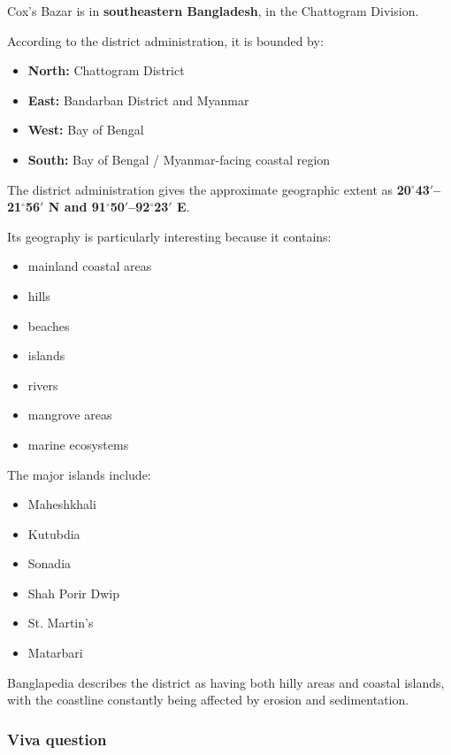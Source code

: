 Cox's Bazar is in \textbf{southeastern Bangladesh}, in the Chattogram Division.

According to the district administration, it is bounded by:

\begin{itemize}
  \item \textbf{North:} Chattogram District
  \item \textbf{East:} Bandarban District and Myanmar
  \item \textbf{West:} Bay of Bengal
  \item \textbf{South:} Bay of Bengal / Myanmar-facing coastal region
\end{itemize}

The district administration gives the approximate geographic extent as \textbf{20$^{\circ}$43$'$--21$^{\circ}$56$'$ N and 91$^{\circ}$50$'$--92$^{\circ}$23$'$ E}.

Its geography is particularly interesting because it contains:

\begin{itemize}
  \item mainland coastal areas
  \item hills
  \item beaches
  \item islands
  \item rivers
  \item mangrove areas
  \item marine ecosystems
\end{itemize}

The major islands include:

\begin{itemize}
  \item Maheshkhali
  \item Kutubdia
  \item Sonadia
  \item Shah Porir Dwip
  \item St. Martin's
  \item Matarbari
\end{itemize}

Banglapedia describes the district as having both hilly areas and coastal islands, with the coastline constantly being affected by erosion and sedimentation.

\subsubsection{Viva question}

